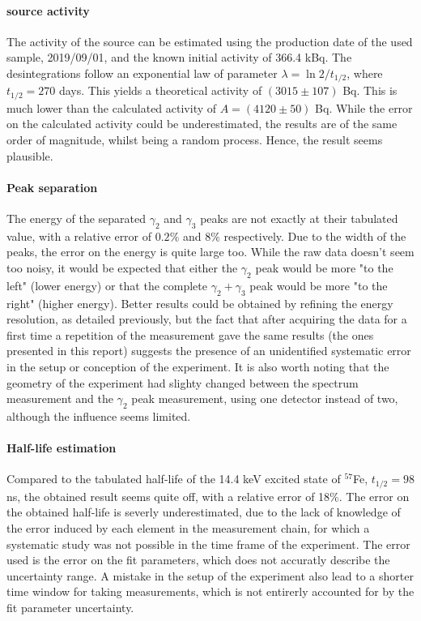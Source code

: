 \paragraph{\cobalt source activity}
The activity of the source can be estimated using the production date of the used sample, 2019/09/01, and the known initial activity of 366.4 kBq. The desintegrations follow an exponential law of parameter \(\lambda = \ln 2 / t_{1/2}\), where \(t_{1/2} = 270\) days. This yields a theoretical activity of \((3015 \pm 107)\) Bq. This is much lower than the calculated activity of \(A = (4120 \pm 50)\) Bq. While the error on the calculated activity could be underestimated, the results are of the same order of magnitude, whilst being a random process. Hence, the result seems plausible.

\paragraph{Peak separation}
The energy of the separated \(\gamma_2\) and \(\gamma_3\) peaks are not exactly at their tabulated value, with a relative error of \(0.2\%\) and \(8\%\) respectively. 
Due to the width of the peaks, the error on the energy is quite large too. 
While the raw data doesn't seem too noisy, it would be expected that either the \(\gamma_2\) peak would be more "to the left" (lower energy) or that the complete \(\gamma_2+\gamma_3\) peak would be more "to the right" (higher energy). 
Better results could be obtained by refining the energy resolution, as detailed previously, but the fact that after acquiring the data for a first time a repetition of the measurement gave the same results (the ones presented in this report) suggests the presence of an unidentified systematic error in the setup or conception of the experiment. 
It is also worth noting that the geometry of the experiment had slighty changed between the spectrum measurement and the \(\gamma_2\) peak measurement, using one detector instead of two, although the influence seems limited.

\paragraph{Half-life estimation}
Compared to the tabulated half-life of the 14.4 keV excited state of $^{57}$Fe, \(t_{1/2} = 98\) ns, the obtained result seems quite off, with a relative error of 18\%. The error on the obtained half-life is severly underestimated, due to the lack of knowledge of the error induced by each element in the measurement chain, for which a systematic study was not possible in the time frame of the experiment. The error used is the error on the fit parameters, which does not accuratly describe the uncertainty range. A mistake in the setup of the experiment also lead to a shorter time window for taking measurements, which is not entirerly accounted for by the fit parameter uncertainty.
